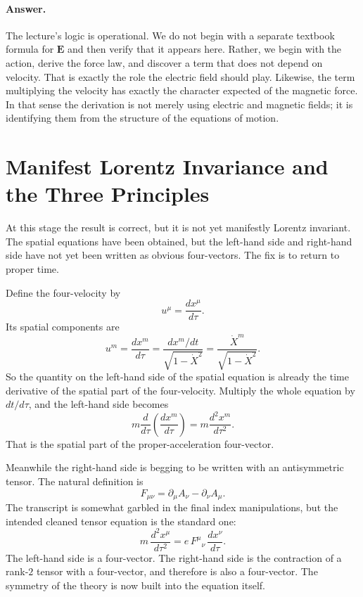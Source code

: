 \paragraph{Answer.} The lecture's logic is operational. We do not begin with a separate textbook formula for $\mathbf E$ and then verify that it appears here. Rather, we begin with the action, derive the force law, and discover a term that does not depend on velocity. That is exactly the role the electric field should play. Likewise, the term multiplying the velocity has exactly the character expected of the magnetic force. In that sense the derivation is not merely using electric and magnetic fields; it is identifying them from the structure of the equations of motion.

\section{Manifest Lorentz Invariance and the Three Principles}

At this stage the result is correct, but it is not yet manifestly Lorentz invariant. The spatial equations have been obtained, but the left-hand side and right-hand side have not yet been written as obvious four-vectors. The fix is to return to proper time.

Define the four-velocity by
\begin{equation}
u^\mu=\frac{dx^\mu}{d\tau}.
\end{equation}
Its spatial components are
\begin{equation}
u^m=\frac{dx^m}{d\tau}
=
\frac{dx^m/dt}{\sqrt{1-\dot X^2}}
=
\frac{\dot X^m}{\sqrt{1-\dot X^2}}.
\end{equation}
So the quantity on the left-hand side of the spatial equation is already the time derivative of the spatial part of the four-velocity. Multiply the whole equation by $dt/d\tau$, and the left-hand side becomes
\begin{equation}
m\frac{d}{d\tau}\left(\frac{dx^m}{d\tau}\right)
=
m\frac{d^2x^m}{d\tau^2}.
\end{equation}
That is the spatial part of the proper-acceleration four-vector.

Meanwhile the right-hand side is begging to be written with an antisymmetric tensor. The natural definition is
\begin{equation}
F_{\mu\nu}=\partial_\mu A_\nu-\partial_\nu A_\mu.
\end{equation}
The transcript is somewhat garbled in the final index manipulations, but the intended cleaned tensor equation is the standard one:
\begin{equation}
m\,\frac{d^2x^\mu}{d\tau^2}
=
e\,F^\mu{}_\nu\,\frac{dx^\nu}{d\tau}.
\end{equation}
The left-hand side is a four-vector. The right-hand side is the contraction of a rank-$2$ tensor with a four-vector, and therefore is also a four-vector. The symmetry of the theory is now built into the equation itself.

